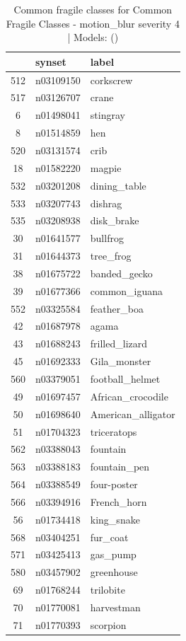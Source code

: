 \begin{table}
\caption{Common fragile classes for Common Fragile Classes - motion_blur severity 4 | Models: ()}
\label{tab:Common Fragile Classes - motion_blur severity 4_d41d8cd9}
\begin{tabular}{cll}
\toprule
 & synset & label \\
\midrule
512 & n03109150 & corkscrew \\
517 & n03126707 & crane \\
6 & n01498041 & stingray \\
8 & n01514859 & hen \\
520 & n03131574 & crib \\
18 & n01582220 & magpie \\
532 & n03201208 & dining_table \\
533 & n03207743 & dishrag \\
535 & n03208938 & disk_brake \\
30 & n01641577 & bullfrog \\
31 & n01644373 & tree_frog \\
38 & n01675722 & banded_gecko \\
39 & n01677366 & common_iguana \\
552 & n03325584 & feather_boa \\
42 & n01687978 & agama \\
43 & n01688243 & frilled_lizard \\
45 & n01692333 & Gila_monster \\
560 & n03379051 & football_helmet \\
49 & n01697457 & African_crocodile \\
50 & n01698640 & American_alligator \\
51 & n01704323 & triceratops \\
562 & n03388043 & fountain \\
563 & n03388183 & fountain_pen \\
564 & n03388549 & four-poster \\
566 & n03394916 & French_horn \\
56 & n01734418 & king_snake \\
568 & n03404251 & fur_coat \\
571 & n03425413 & gas_pump \\
580 & n03457902 & greenhouse \\
69 & n01768244 & trilobite \\
70 & n01770081 & harvestman \\
71 & n01770393 & scorpion \\

\end{tabular}
\end{table}
